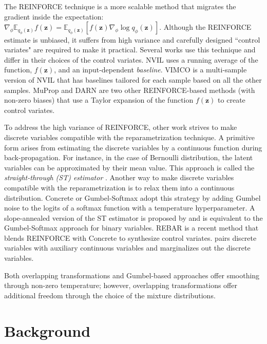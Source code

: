 \documentclass{article}
\newcommand{\z}{{\pmb{z}}}
\begin{document}
The REINFORCE technique \cite{williams1992simple} is a more scalable method that migrates the gradient inside the expectation: $\nabla_{\phi} \mathbb{E}_{q_\phi(\z)}f(\z) = \mathbb{E}_{q_{\phi}(\z)} [f(\z) \nabla_{\phi} \log{q_{\phi}(\z)}].$
Although the REINFORCE estimate is unbiased, it suffers from high variance and carefully designed ``control variates" are required to make it practical. 
Several works use this technique and differ in their choices of the control variates. NVIL \cite{mnih2014neural} uses a running average of 
the function, $f(\z)$, and an input-dependent \emph{baseline}. 
VIMCO \cite{mnih2016variational} is a multi-sample version of NVIL that has baselines tailored for each sample based on all the other samples. MuProp \cite{gu2015muprop} and DARN \cite{gregorICML14} are two other 
REINFORCE-based methods (with non-zero biases) that use a Taylor expansion of the function $f(\z)$ to create control variates.

To address the high variance of REINFORCE, other work strives to make discrete variables compatible with the reparametrization technique. A primitive form arises from estimating the discrete variables by a continuous function during back-propagation. For instance, in the case of Bernoulli distribution, the latent variables can be approximated by their mean value. This approach is called the \textit{straight-through (ST) estimator} \cite{bengio2013estimating}.  Another way to make discrete variables compatible with the reparametrization is to relax them into a continuous distribution. Concrete \cite{maddison2016concrete} or Gumbel-Softmax \cite{jang2016categorical} adopt this strategy by adding Gumbel noise to the logits of a softmax function with a temperature hyperparameter. A slope-annealed version of the ST estimator is proposed by \cite{chung2016hierarchical} and is equivalent to the Gumbel-Softmax approach for binary variables. REBAR \cite{tucker2017rebar} is a recent method that blends REINFORCE with Concrete to synthesize control variates. \cite{rolfe2016discrete} pairs discrete variables with auxiliary continuous variables and marginalizes out the discrete variables. 

Both overlapping transformations and Gumbel-based approaches offer smoothing through non-zero temperature; however, overlapping transformations
offer additional freedom through the choice of the mixture distributions. 

\section{Background}
\end{document}

